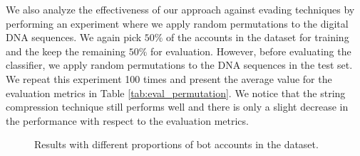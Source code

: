 \documentclass{llncs}
\begin{document}
We also analyze the effectiveness of our approach against evading techniques by performing an experiment where we apply random permutations to the digital DNA sequences. We again pick $50\%$ of the accounts in the dataset for training and the keep the remaining $50\%$ for evaluation. However, before evaluating the classifier, we apply random permutations to the DNA sequences in the test set. We repeat this experiment 100 times and present the average value for the evaluation metrics in Table \ref{tab:eval_permutation}. We notice that the string compression technique still performs well and there is only a slight decrease in the performance with respect to the evaluation metrics.

\begin{figure}
    \centering
    \qquad
    \caption{\label{fig:eval_proportion} Results with different proportions of bot accounts in the dataset.}
\end{figure}
\end{document}
